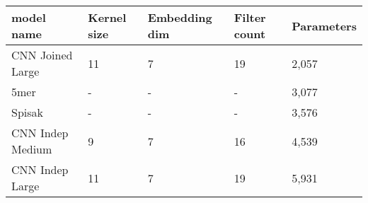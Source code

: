\begin{tabular}{lllll}
\toprule
model name & Kernel size & Embedding dim & Filter count & Parameters \\
\midrule
CNN Joined Large & 11 & 7 & 19 & 2,057 \\
5mer & - & - & - & 3,077 \\
Spisak & - & - & - & 3,576 \\
CNN Indep Medium & 9 & 7 & 16 & 4,539 \\
CNN Indep Large & 11 & 7 & 19 & 5,931 \\
\bottomrule
\end{tabular}
